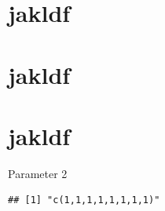 \section{jakldf}\label{jakldf}

\section{jakldf}\label{jakldf-1}

\section{jakldf}\label{jakldf-2}

\begin{frame}[fragile]{Parameter 2}

\begin{verbatim}
## [1] "c(1,1,1,1,1,1,1,1)"
\end{verbatim}

\end{frame}

